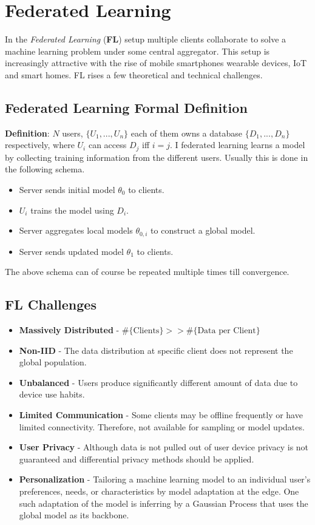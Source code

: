 \section{Federated Learning}
In the \textit{Federated Learning} (\textbf{FL}) setup multiple clients collaborate to solve a machine learning problem under some central aggregator. This setup is increasingly attractive with the rise of mobile smartphones wearable devices, IoT and smart homes. FL rises a few theoretical and technical challenges.

\subsection{Federated Learning Formal Definition}
\textbf{Definition}: $N$ users, $\{U_{1},...,U_{n}\}$ each of them owns a database  $\{D_{1},...,D_{n} \}$ respectively, where $U_{i}$ can access $D_{j}$ iff $i=j$. I federated learning learns a model by collecting training information from the different users. Usually this is done in the following schema.
\begin{itemize}
    \item Server sends initial model $\theta_{0}$ to clients.
    \item $U_{i}$ trains the model using $D_{i}$.
    \item Server aggregates local models $\theta_{0,i}$ to construct a global model.
    \item Server sends updated model $\theta_{1}$ to clients.
\end{itemize}
The above schema can of course be repeated multiple times till convergence.

\subsection{FL Challenges}
\begin{itemize}
    \item \textbf{Massively Distributed} - $\# \{ \text{Clients} \} > >  \# \{ \text{Data per Client} \}$
    \item \textbf{Non-IID} - The data distribution at specific client does not represent the global population.
    \item \textbf{Unbalanced} - Users produce significantly different amount of data due to device use habits.
    \item \textbf{Limited Communication} - Some clients may be offline frequently or have limited connectivity. Therefore, not available for sampling or model updates.               
    \item \textbf{User Privacy} - Although data is not pulled out of user device privacy is not guaranteed and differential privacy methods should be applied.
    \item \textbf{Personalization} - Tailoring a machine learning model to an individual user's preferences, needs, or characteristics by model adaptation at the edge. One such adaptation of the model is inferring by a Gaussian Process that uses the global model as its backbone.
\end{itemize}